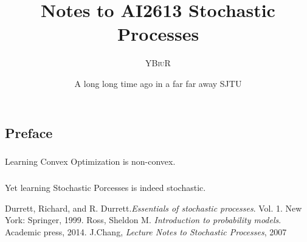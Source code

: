 \documentclass[oneside]{book}
\title{Notes to AI2613 Stochastic Processes}
\author{\textsc{YBiuR}}
\date{A long long time ago in a far far away SJTU}
\theoremstyle{definition}
\theoremstyle{remark}
\begin{document}
\begin{spacing}{1.2}
\setlength{\parskip}{1em}
\setlength{\parindent}{0em}

\frontmatter
\maketitle
\chapter*{Preface}
\paragraph{}Learning Convex Optimization is non-convex.
\paragraph{}Yet learning Stochastic Porcesses is indeed stochastic.
\mainmatter



\begin{thebibliography}{9}
     Durrett, Richard, and R. Durrett.\textit{Essentials of stochastic processes}. Vol. 1. New York: Springer, 1999.
     Ross, Sheldon M. \textit{Introduction to probability models}. Academic press, 2014.
     J.Chang, \textit{Lecture Notes to Stochastic Processes}, 2007
\end{thebibliography}

\end{spacing}
\end{document}
